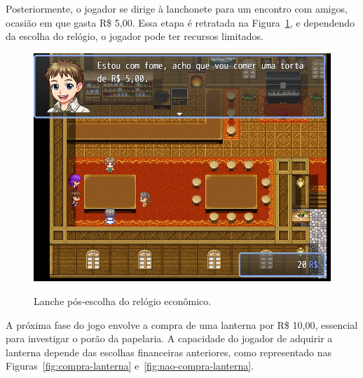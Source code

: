 Posteriormente, o jogador se dirige à lanchonete para um encontro com amigos, ocasião em que gasta R\$ 5,00. Essa etapa é retratada na Figura~\ref{fig:lanchonete-pos-relogio}, e dependendo da escolha do relógio, o jogador pode ter recursos limitados.%

\begin{figure}[!htbp]
	\centering
	\caption{Lanche pós-escolha do relógio econômico.}
	\includegraphics[scale=0.5]{Textuais/Pictures/lanchonete-pos-relogio.png}
	\label{fig:lanchonete-pos-relogio}
\end{figure}


A próxima fase do jogo envolve a compra de uma lanterna por R\$ 10,00, essencial para investigar o porão da papelaria. A capacidade do jogador de adquirir a lanterna depende das escolhas financeiras anteriores, como representado nas Figuras~\ref{fig:compra-lanterna} e~\ref{fig:nao-compra-lanterna}.

